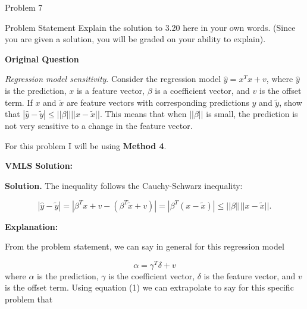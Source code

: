 \begin{problem}{Problem 7}
    \begin{statement}{Problem Statement}
        Explain the solution to 3.20 here in your own words. (Since you are given a solution, you will be graded on your ability to explain). \vspace*{1em}

        \textbf{Original Question} \vspace*{1em}

        \textit{Regression model sensitivity}. Consider the regression model $\hat{y} = x^{T}x + v$, where $\hat{y}$ is the prediction, $x$ is a feature vector, $\beta$ is a coefficient vector, and
        $v$ is the offset term. If $x$ and $\tilde{x}$ are feature vectors with corresponding predictions $\hat{y}$ and $\tilde{y}$, show that $|\hat{y} - \tilde{y}| \leq ||\beta|| ||x - \tilde{x}||$.
        This means that when $||\beta||$ is small, the prediction is not very sensitive to a change in the feature vector.
    \end{statement}

    \begin{Highlight}[Solution]
        For this problem I will be using \textbf{Method 4}. \vspace*{1em}

        \textbf{VMLS Solution:} \vspace*{1em}

        \textbf{Solution.} The inequality follows the Cauchy-Schwarz inequality:

        \begin{equation*}
            |\hat{y} - \tilde{y}| = |\beta^{T}x + v - (\beta^{T}\tilde{x} + v)| = |\beta^{T}(x - \tilde{x})| \leq ||\beta||||x - \tilde{x}||.
        \end{equation*}

        \textbf{Explanation:} \vspace*{1em}

        From the problem statement, we can say in general for this regression model

        \setcounter{equation}{0}
        \begin{equation}
            \alpha = \gamma^{T}\delta + v
        \end{equation}
        where $\alpha$ is the prediction, $\gamma$ is the coefficient vector, $\delta$ is the feature vector, and $v$ is the offset term. Using equation (1) we can extrapolate to say for this specific
        problem that


\end{Highlight}
\end{problem}
